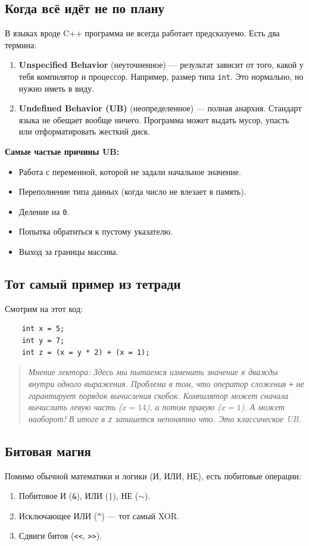 \documentclass[a4paper, 12pt]{article}
\newcommand{\term}[1]{\textbf{#1}} %
\newcommand{\code}[1]{\texttt{#1}} %
\newcommand{\barchevnote}[1]{\begin{quote}\small\itshape Мнение лектора: #1\end{quote}}
\begin{document}
\subsection*{Когда всё идёт не по плану}
В языках вроде C++ программа не всегда работает предсказуемо. Есть два термина:

\begin{enumerate}
    \item \term{Unspecified Behavior} (неуточненное) --- результат зависит от того, какой у тебя компилятор и процессор. Например, размер типа \code{int}. Это нормально, но нужно иметь в виду.
    \item \term{Undefined Behavior (UB)} (неопределенное) --- полная анархия. Стандарт языка не обещает вообще ничего. Программа может выдать мусор, упасть или отформатировать жесткий диск.
\end{enumerate}

\textbf{Самые частые причины UB:}
\begin{itemize}
    \item Работа с переменной, которой не задали начальное значение.
    \item Переполнение типа данных (когда число не влезает в память).
    \item Деление на \code{0}.
    \item Попытка обратиться к пустому указателю.
    \item Выход за границы массива.
\end{itemize}

\subsection*{Тот самый пример из тетради}
Смотрим на этот код:
\begin{verbatim}
    int x = 5;
    int y = 7;
    int z = (x = y * 2) + (x = 1);
\end{verbatim}

\barchevnote{Здесь мы пытаемся изменить значение \code{x} дважды внутри одного выражения. Проблема в том, что оператор сложения \code{+} не гарантирует порядок вычисления скобок. Компилятор может сначала вычислить левую часть ($x=14$), а потом правую ($x=1$). А может наоборот! В итоге в \code{z} запишется непонятно что. Это классическое UB.}

\subsection*{Битовая магия}
Помимо обычной математики и логики (И, ИЛИ, НЕ), есть побитовые операции:
\begin{enumerate}
    \item Побитовое И (\code{\&}), ИЛИ (\code{|}), НЕ (\code{$\sim$}).
    \item Исключающее ИЛИ (\code{\^}) --- тот самый XOR.
    \item Сдвиги битов (\code{<<}, \code{>>}).
\end{enumerate}
\end{document}
